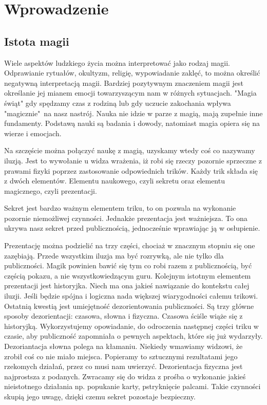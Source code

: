 \section{Wprowadzenie}

\subsection{Istota magii}
Wiele aspektów ludzkiego życia można interpretować jako rodzaj magii. Odprawianie rytuałów, okultyzm, religię, wypowiadanie zaklęć, to można określić negatywną interpretacją magii. Bardziej pozytywnym znaczeniem magii jest określanie jej mianem emocji towarzyszącym nam w różnych sytuacjach. "Magia świąt" gdy spędzamy czas z rodziną lub gdy uczucie zakochania wpływa "magicznie"\ na nasz nastrój. Nauka nie idzie w parze z magią, mają zupełnie inne fundamenty. Podstawą nauki są badania i dowody, natomiast magia opiera się na wierze i emocjach.\par Na szczęście można połączyć naukę z magią, uzyskamy wtedy coś co nazywamy iluzją. Jest to wywołanie u widza wrażenia, iż robi się rzeczy pozornie sprzeczne z prawami fizyki poprzez zastosowanie odpowiednich trików. Każdy trik składa się z dwóch elementów. Elementu naukowego, czyli sekretu oraz elementu magicznego, czyli prezentacji.\par Sekret jest bardzo ważnym elementem triku, to on pozwala na wykonanie pozornie niemożliwej czynności. Jednakże prezentacja jest ważniejsza. To ona ukrywa nasz sekret przed publicznością, jednocześnie wprawiając ją w osłupienie.\par Prezentację można podzielić na trzy części, chociaż w znacznym stopniu się one zazębiają. Przede wszystkim iluzja ma być rozrywką, ale nie tylko dla publiczności. Magik powinien bawić się tym co robi razem z publicznością, być częścią pokazu, a nie wszystkowiedzącym guru. Kolejnym istotnym elementem prezentacji jest historyjka. Niech ma ona jakieś nawiązanie do kontekstu całej iluzji. Jeśli będzie spójna i logiczna nada większej wiarygodności całemu trikowi. Ostatnią kwestią jest umiejętność dezorientowania publiczności. Są trzy główne sposoby dezorientacji: czasowa, słowna i fizyczna. Czasowa ściśle wiąże się z historyjką. Wykorzystujemy opowiadanie, do odroczenia następnej części triku w czasie, aby publiczność zapomniała o pewnych aspektach, które się już wydarzyły. Dezoriantacja słowna polega na kłamaniu. Niekiedy wmawiamy widzowi, że zrobił coś co nie miało miejsca. Popieramy to sztucznymi rezultatami jego rzekomych działań, przez co musi nam uwierzyć. Dezorientacja fizyczna jest najprostsza z podanych. Zwracamy się do widza z prośba o wykonanie jakieś nieistotnego działania np. popukanie karty, pstryknięcie palcami. Takie czynności skupią jego uwagę, dzięki czemu sekret pozostaje bezpieczny.

